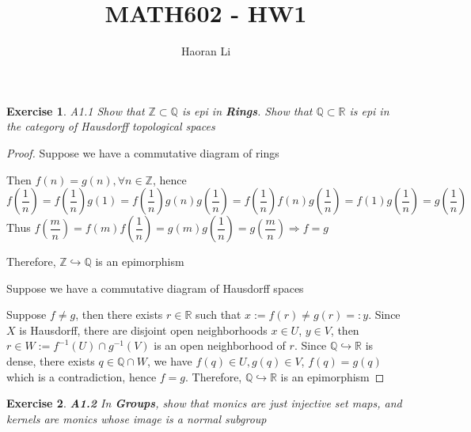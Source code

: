 \documentclass{article}
\title{MATH602 - HW1}
\author{Haoran Li}
\date{}
\newtheorem*{exercise}{Exercise}
\theoremstyle{definition}
\theoremstyle{remark}
\theoremstyle{definition}
\begin{document}
\sloppy %

\maketitle
\begin{exercise}A1.1
Show that $\mathbb Z\subset \mathbb Q$ is epi in \textbf{Rings}. Show that $\mathbb Q\subset \mathbb R$ is epi in the category of Hausdorff topological spaces
\end{exercise}

\begin{proof}
Suppose we have a commutative diagram of rings
\begin{center}
\end{center}
Then $f(n)=g(n), \forall n\in\mathbb Z$, hence
\[f\left(\frac{1}{n}\right)=f\left(\frac{1}{n}\right)g(1)=f\left(\frac{1}{n}\right)g(n)g\left(\frac{1}{n}\right)=f\left(\frac{1}{n}\right)f(n)g\left(\frac{1}{n}\right)=f(1)g\left(\frac{1}{n}\right)=g\left(\frac{1}{n}\right)\]
Thus $f\left(\dfrac{m}{n}\right)=f(m)f\left(\dfrac{1}{n}\right)=g(m)g\left(\dfrac{1}{n}\right)=g\left(\dfrac{m}{n}\right)\Rightarrow f=g$ \par
Therefore, $\mathbb Z\hookrightarrow\mathbb Q$ is an epimorphism \par
Suppose we have a commutative diagram of Hausdorff spaces
\begin{center}
\end{center}
Suppose $f\neq g$, then there exists $r\in\mathbb R$ such that $x:=f(r)\neq g(r)=:y$. Since $X$ is Hausdorff, there are disjoint open neighborhoods $x\in U$, $y\in V$, then $r\in W:=f^{-1}(U)\cap g^{-1}(V)$ is an open neighborhood of $r$. Since $\mathbb Q\hookrightarrow\mathbb R$ is dense, there exists $q\in\mathbb Q\cap W$, we have $f(q)\in U, g(q)\in V$, $f(q)=g(q)$ which is a contradiction, hence $f=g$. Therefore, $\mathbb Q\hookrightarrow\mathbb R$ is an epimorphism
\end{proof}

\begin{exercise}{\textbf{A1.2}}
In \textbf{Groups}, show that monics are just injective set maps, and kernels are monics whose image is a normal subgroup
\end{exercise}
\end{document}
